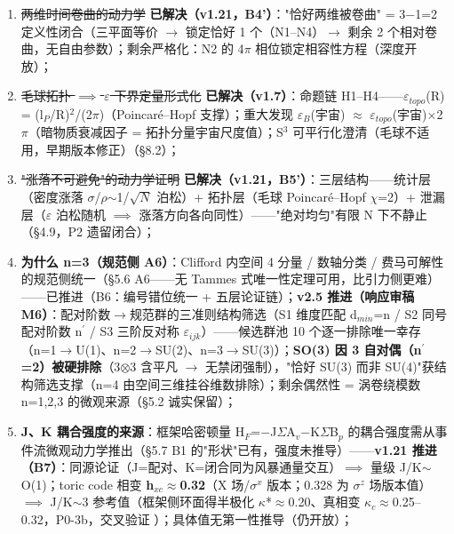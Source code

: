 \documentclass[12pt]{article}
\newcommand{\up}[1]{\ensuremath{^{#1}}}
\newcommand{\down}[1]{\ensuremath{_{#1}}}
\begin{document}
\begin{enumerate}
\item \sout{两维时间卷曲的动力学} \textbf{\checkmark 已解决（v1.21，B4'）}："恰好两维被卷曲" = 3\ensuremath{-}1=2 定义性闭合（三平面等价 \ensuremath{\to} 锁定恰好 1 个（N1--N4）\ensuremath{\to} 剩余 2 个相对卷曲，无自由参数）；剩余严格化：N2 的 4\ensuremath{\pi} 相位锁定相容性方程（深度开放）；
\item \sout{毛球拓扑 \ensuremath{\implies} \ensuremath{\varepsilon} 下界定量形式化} \textbf{\checkmark 已解决（v1.7）}：命题链 H1--H4------\ensuremath{\varepsilon}\down{topo}(R) = (l\down{P}/R)\up{2}/(2\ensuremath{\pi})（Poincar\'{e}--Hopf 支撑）；重大发现 \ensuremath{\varepsilon}\down{B}(宇宙) \ensuremath{\approx} \ensuremath{\varepsilon}\down{topo}(宇宙)\ensuremath{\times}2\ensuremath{\pi}（暗物质衰减因子 = 拓扑分量宇宙尺度值）；S\up{3} 可平行化澄清（毛球不适用，早期版本修正）（\S{}8.2）；
\item \sout{"涨落不可避免"的动力学证明} \textbf{\checkmark 已解决（v1.21，B5'）}：三层结构------统计层（密度涨落 \ensuremath{\sigma}/\ensuremath{\rho}\ensuremath{\sim}1/\ensuremath{\sqrt{N}} 泊松）+ 拓扑层（毛球 Poincar\'{e}--Hopf \ensuremath{\chi}=2）+ 泄漏层（\ensuremath{\varepsilon} 泊松随机 \ensuremath{\implies} 涨落方向各向同性）------"绝对均匀"有限 N 下不静止（\S{}4.9，P2 遗留闭合）；
\item \textbf{为什么 n=3（规范侧 A6）}：Clifford 内空间 4 分量 / 数轴分类 / 费马可解性的规范侧统一（\S{}5.6 A6------无 Tammes 式唯一性定理可用，比引力侧更难）------\checkmark 已推进（B6：编号错位统一 + 五层论证链）；\textbf{v2.5 推进（响应审稿 M6）}：配对阶数\ensuremath{\to}规范群的三准则结构筛选（S1 维度匹配 d\down{min}=n / S2 同号配对阶数 n\ensuremath{^\prime} / S3 三阶反对称 \ensuremath{\varepsilon}\down{ijk}）------候选群池 10 个逐一排除唯一幸存（n=1\ensuremath{\to}U(1)、n=2\ensuremath{\to}SU(2)、n=3\ensuremath{\to}SU(3)）；\textbf{SO(3) 因 3 自对偶（n\ensuremath{^\prime}=2）被硬排除}（3\ensuremath{\otimes}3 含平凡 \ensuremath{\to} 无禁闭强制），"恰好 SU(3) 而非 SU(4)"获结构筛选支撑（n=4 由空间三维挂谷维数排除）；剩余偶然性 = 涡卷绕模数 n=1,2,3 的微观来源（\S{}5.2 诚实保留）；
\item \textbf{J、K 耦合强度的来源}：框架哈密顿量 H\down{F}=\ensuremath{-}J\ensuremath{\Sigma}A\down{v}\ensuremath{-}K\ensuremath{\Sigma}B\down{p} 的耦合强度需从事件流微观动力学推出（\S{}5.7 B1 的"形状"已有，强度未推导）------\textbf{v1.21 推进（B7）}：同源论证（J=配对、K=闭合同为风暴通量交互）\ensuremath{\implies} 量级 J/K\ensuremath{\sim}O(1)；toric code 相变 \textbf{h\down{xc}\ensuremath{\approx}0.32}（X 场/\ensuremath{\sigma}\up{x} 版本；0.328 为 \ensuremath{\sigma}\up{z} 场版本值）\ensuremath{\implies} J/K\ensuremath{\sim}3 参考值（框架侧环面得半极化 \ensuremath{\kappa}*\ensuremath{\approx}0.20、真相变 \ensuremath{\kappa}\down{c}\ensuremath{\approx}0.25--0.32，P0-3b，交叉验证 \checkmark）；具体值无第一性推导（仍开放）；

\end{enumerate}
\end{document}
